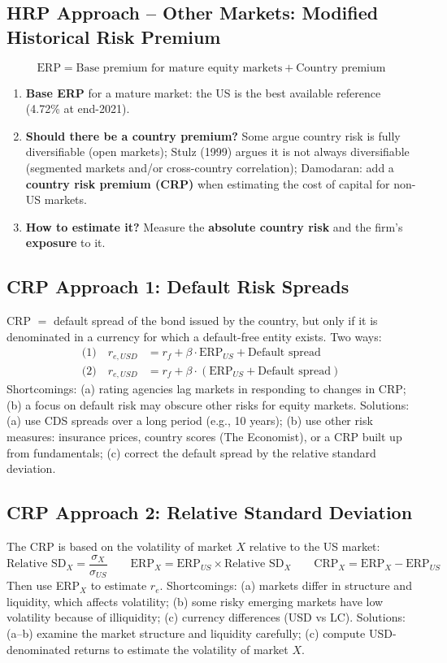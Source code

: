 \subsection{HRP Approach -- Other Markets: Modified Historical Risk Premium}
\begin{keybox}
\[
\text{ERP}=\text{Base premium for mature equity markets}+\text{Country premium}
\]
\end{keybox}
\begin{enumerate}
  \item \textbf{Base ERP} for a mature market: the US is the best available reference (4.72\% at end-2021).
  \item \textbf{Should there be a country premium?} Some argue country risk is fully diversifiable (open markets); Stulz (1999) argues it is not always diversifiable (segmented markets and/or cross-country correlation); Damodaran: add a \textbf{country risk premium (CRP)} when estimating the cost of capital for non-US markets.
  \item \textbf{How to estimate it?} Measure the \textbf{absolute country risk} and the firm's \textbf{exposure} to it.
\end{enumerate}

\subsection{CRP Approach 1: Default Risk Spreads}
CRP $=$ default spread of the bond issued by the country, but only if it is denominated in a currency for which a default-free entity exists. Two ways:
\begin{align*}
\text{(1)}\quad r_{e,USD}&=r_f+\beta\cdot\text{ERP}_{US}+\text{Default spread}\\
\text{(2)}\quad r_{e,USD}&=r_f+\beta\cdot(\text{ERP}_{US}+\text{Default spread})
\end{align*}
Shortcomings: (a) rating agencies lag markets in responding to changes in CRP; (b) a focus on default risk may obscure other risks for equity markets. Solutions: (a) use CDS spreads over a long period (e.g., 10 years); (b) use other risk measures: insurance prices, country scores (The Economist), or a CRP built up from fundamentals; (c) correct the default spread by the relative standard deviation.

\subsection{CRP Approach 2: Relative Standard Deviation}
The CRP is based on the volatility of market $X$ relative to the US market:
\[
\text{Relative SD}_X=\frac{\sigma_X}{\sigma_{US}}\qquad \text{ERP}_X=\text{ERP}_{US}\times\text{Relative SD}_X\qquad \text{CRP}_X=\text{ERP}_X-\text{ERP}_{US}
\]
Then use ERP$_X$ to estimate $r_e$. Shortcomings: (a) markets differ in structure and liquidity, which affects volatility; (b) some risky emerging markets have low volatility because of illiquidity; (c) currency differences (USD vs LC). Solutions: (a--b) examine the market structure and liquidity carefully; (c) compute USD-denominated returns to estimate the volatility of market $X$.

